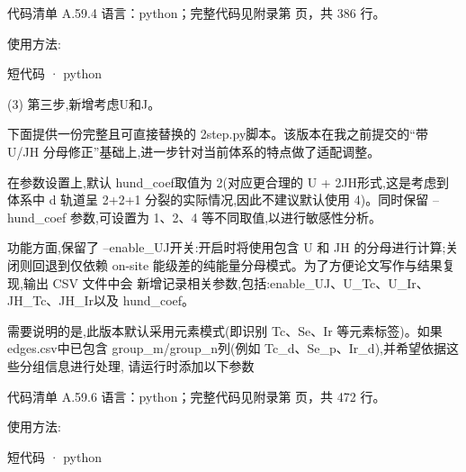 \documentclass[lang=cn,scheme=chinese,color=blue,device=normal,toc=onecol,math=cm]{elegantbook}
\begin{document}
\begin{codeindexbox}{代码清单 A.59.4}
语言：python；完整代码见附录第 \pageref{code:59:4} 页，共 386 行。
\end{codeindexbox}


使用方法:\par


\begin{inlinecodebox}{短代码 · python}
\end{inlinecodebox}


(3) 第三步,新增考虑U和J。\par


下面提供一份完整且可直接替换的 2step.py脚本。该版本在我之前提交的“带 U/\allowbreak{}JH 分母修正”基础上,进一步针对当前体系的特点做了适配调整。\par


在参数设置上,默认 hund\_\allowbreak{}coef取值为 2(对应更合理的 U + 2JH形式,这是考虑到体系中 d 轨道呈 2+2+1 分裂的实际情况,因此不建议默认使用 4)。同时保留 –hund\_\allowbreak{}coef 参数,可设置为 1、2、4 等不同取值,以进行敏感性分析。\par


功能方面,保留了 –enable\_\allowbreak{}UJ开关:开启时将使用包含 U 和 JH 的分母进行计算;关闭则回退到仅依赖 on-site 能级差的纯能量分母模式。为了方便论文写作与结果复现,输出 CSV 文件中会 新增记录相关参数,包括:enable\_\allowbreak{}UJ、U\_\allowbreak{}Tc、U\_\allowbreak{}Ir、JH\_\allowbreak{}Tc、JH\_\allowbreak{}Ir以及 hund\_\allowbreak{}coef。\par


需要说明的是,此版本默认采用元素模式(即识别 Tc、Se、Ir 等元素标签)。如果 edges.csv中已包含 group\_\allowbreak{}m/\allowbreak{}group\_\allowbreak{}n列(例如 Tc\_\allowbreak{}d、Se\_\allowbreak{}p、Ir\_\allowbreak{}d),并希望依据这些分组信息进行处理, 请运行时添加以下参数\par


\begin{codeindexbox}{代码清单 A.59.6}
语言：python；完整代码见附录第 \pageref{code:59:6} 页，共 472 行。
\end{codeindexbox}


使用方法:\par


\begin{inlinecodebox}{短代码 · python}
\end{inlinecodebox}
\end{document}
